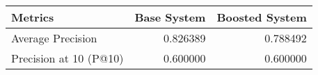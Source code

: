 \begin{tabular}{lrr}
\toprule
               Metrics &  Base System &  Boosted System \\
\midrule
     Average Precision &     0.826389 &        0.788492 \\
Precision at 10 (P@10) &     0.600000 &        0.600000 \\
\bottomrule
\end{tabular}
